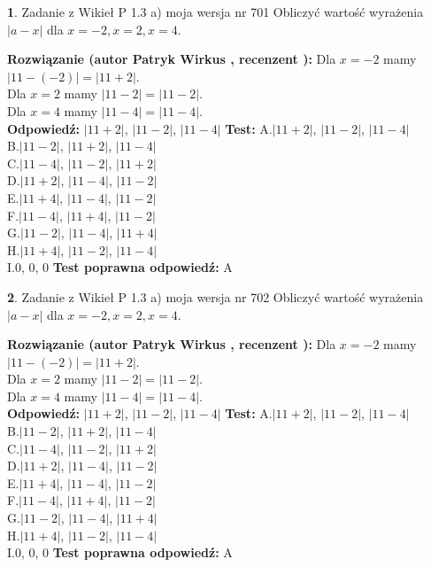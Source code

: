 \documentclass[12pt, a4paper]{article}
\theoremstyle{definition} %
\newtheorem{zad}{}
\newcommand{\zadStart}[1]{\begin{zad}#1\newline}
\newcommand{\zadStop}{\end{zad}}
\newcommand{\rozwStart}[2]{\noindent \textbf{Rozwiązanie (autor #1 , recenzent #2): }\newline}
\newcommand{\rozwStop}{\newline}
\newcommand{\odpStart}{\noindent \textbf{Odpowiedź:}\newline}
\newcommand{\odpStop}{\newline}
\newcommand{\testStart}{\noindent \textbf{Test:}\newline}
\newcommand{\testStop}{\newline}
\newcommand{\kluczStart}{\noindent \textbf{Test poprawna odpowiedź:}\newline}
\newcommand{\kluczStop}{\newline}
\begin{document}
\zadStart{Zadanie z Wikieł P 1.3 a) moja wersja nr 701}
Obliczyć wartość wyrażenia $|a - x|$ dla $x=-2,x=2,x=4$.
\zadStop
\rozwStart{Patryk Wirkus}{}
Dla $x = -2$ mamy $|11 - (-2)| = |11 + 2|$.\\
Dla $x = 2$ mamy $|11 - 2| = |11 - 2|$.\\
Dla $x = 4$ mamy $|11 - 4| = |11 - 4|$.\\
\rozwStop
\odpStart
$|11 + 2|$, $|11 - 2|$, $|11 - 4|$
\odpStop
\testStart
A.$|11 + 2|$, $|11 - 2|$, $|11 - 4|$\\
B.$|11 - 2|$, $|11 + 2|$, $|11 - 4|$\\
C.$|11 - 4|$, $|11 - 2|$, $|11 + 2|$\\
D.$|11 + 2|$, $|11 - 4|$, $|11 - 2|$\\
E.$|11 + 4|$, $|11 - 4|$, $|11 - 2|$\\
F.$|11 - 4|$, $|11 + 4|$, $|11 - 2|$\\
G.$|11 - 2|$, $|11 - 4|$, $|11 + 4|$\\
H.$|11 + 4|$, $|11 - 2|$, $|11 - 4|$\\
I.$0$, $0$, $0$
\testStop
\kluczStart
A
\kluczStop



\zadStart{Zadanie z Wikieł P 1.3 a) moja wersja nr 702}
Obliczyć wartość wyrażenia $|a - x|$ dla $x=-2,x=2,x=4$.
\zadStop
\rozwStart{Patryk Wirkus}{}
Dla $x = -2$ mamy $|11 - (-2)| = |11 + 2|$.\\
Dla $x = 2$ mamy $|11 - 2| = |11 - 2|$.\\
Dla $x = 4$ mamy $|11 - 4| = |11 - 4|$.\\
\rozwStop
\odpStart
$|11 + 2|$, $|11 - 2|$, $|11 - 4|$
\odpStop
\testStart
A.$|11 + 2|$, $|11 - 2|$, $|11 - 4|$\\
B.$|11 - 2|$, $|11 + 2|$, $|11 - 4|$\\
C.$|11 - 4|$, $|11 - 2|$, $|11 + 2|$\\
D.$|11 + 2|$, $|11 - 4|$, $|11 - 2|$\\
E.$|11 + 4|$, $|11 - 4|$, $|11 - 2|$\\
F.$|11 - 4|$, $|11 + 4|$, $|11 - 2|$\\
G.$|11 - 2|$, $|11 - 4|$, $|11 + 4|$\\
H.$|11 + 4|$, $|11 - 2|$, $|11 - 4|$\\
I.$0$, $0$, $0$
\testStop
\kluczStart
A
\kluczStop
\end{document}
